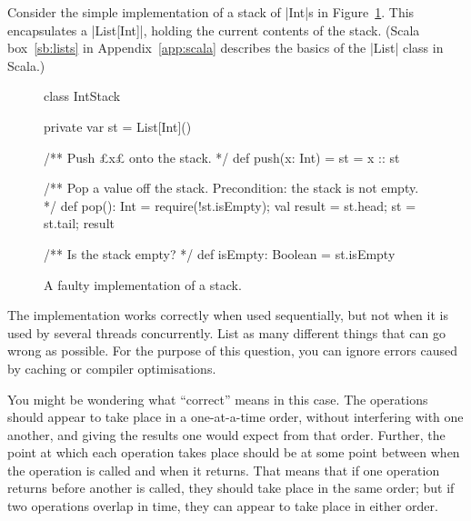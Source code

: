 \begin{questionS}
\label{exercise:stackRace}
Consider the simple implementation of a stack of |Int|s in
Figure~\ref{fig:stackRace}.  This encapsulates a |List[Int]|, holding the
current contents of the stack.  (Scala box~\ref{sb:lists} in
Appendix~\ref{app:scala} describes the basics of the |List| class in Scala.)


\begin{figure}
\begin{scala}
class IntStack{
  private var st = List[Int]()

  /** Push £x£ onto the stack. */
  def push(x: Int) = { st = x :: st }

  /** Pop a value off the stack.  Precondition: the stack is not empty. */
  def pop(): Int = {
    require(!st.isEmpty); val result = st.head; st = st.tail; result
  }

  /** Is the stack empty? */
  def isEmpty: Boolean = st.isEmpty
}
\end{scala}
\caption{A faulty implementation of a stack.}
\label{fig:stackRace}
\end{figure}






The implementation works correctly when used sequentially, but not when it is
used by several threads concurrently.  List as many different things that can
go wrong as possible.  For the purpose of this question, you can ignore errors
caused by caching or compiler optimisations.

You might be wondering what ``correct'' means in this case.  The operations
should appear to take place in a one-at-a-time order, without interfering with
one another, and giving the results one would expect from that order.
Further, the point at which each operation takes place should be at some point
between when the operation is called and when it returns.  That means that if
one operation returns before another is called, they should take place in the
same order; but if two operations overlap in time, they can appear to take
place in either order.


\end{questionS}
